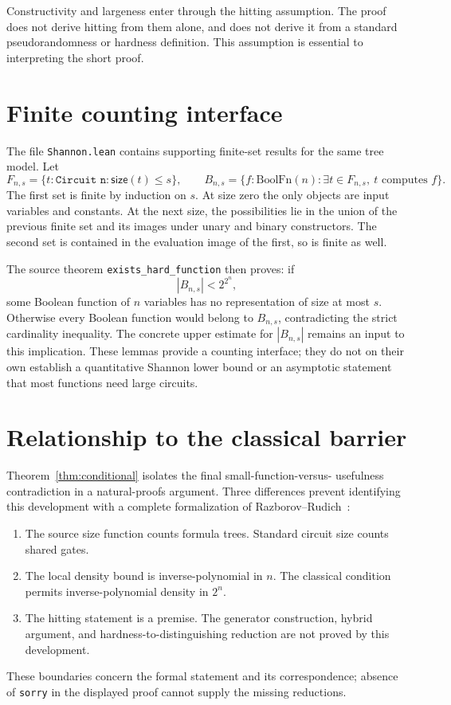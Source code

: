 \documentclass[11pt]{amsart}
\theoremstyle{plain}
\theoremstyle{definition}
\newcommand{\size}{\mathsf{size}}
\begin{document}
Constructivity and largeness enter through the hitting assumption.
The proof does not derive hitting from them alone, and does not
derive it from a standard pseudorandomness or hardness definition.
This assumption is essential to interpreting the short proof.

\section{Finite counting interface}
\label{sec:counting}

The file \texttt{Shannon.lean} contains supporting finite-set results
for the same tree model. Let
\[
 F_{n,s}=\{t:\texttt{Circuit n}:\size(t)\le s\},\qquad
 B_{n,s}=\{f:\mathrm{BoolFn}(n):\exists t\in F_{n,s},\
                              t\text{ computes }f\}.
\]
The first set is finite by induction on $s$. At size zero the only
objects are input variables and constants. At the next size, the
possibilities lie in the union of the previous finite set and its
images under unary and binary constructors.
The second set is contained in the evaluation image of the first,
so is finite as well.

The source theorem \texttt{exists\_hard\_function} then proves:
if
\[
             |B_{n,s}|<2^{2^n},
\]
some Boolean function of $n$ variables has no representation of size
at most $s$. Otherwise every Boolean function would belong to
$B_{n,s}$, contradicting the strict cardinality inequality.
The concrete upper estimate for $|B_{n,s}|$ remains an input to this
implication. These lemmas provide a counting interface; they do not
on their own establish a quantitative Shannon lower bound or an
asymptotic statement that most functions need large circuits.

\section{Relationship to the classical barrier}
\label{sec:comparison}

Theorem~\ref{thm:conditional} isolates the final small-function-versus-
usefulness contradiction in a natural-proofs argument. Three
differences prevent identifying this development with a complete
formalization of Razborov--Rudich~\cite{RR97}:
\begin{enumerate}[nosep]
\item The source size function counts formula trees.
      Standard circuit size counts shared gates.
\item The local density bound is inverse-polynomial in $n$.
      The classical condition permits inverse-polynomial density in $2^n$.
\item The hitting statement is a premise. The generator construction,
      hybrid argument, and hardness-to-distinguishing reduction are
      not proved by this development.
\end{enumerate}
These boundaries concern the formal statement and its correspondence;
absence of \texttt{sorry} in the displayed proof cannot supply the
missing reductions.
\end{document}
